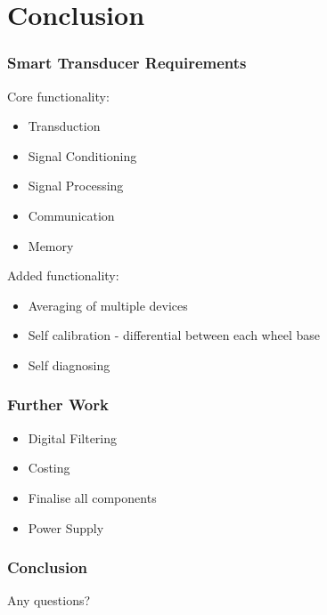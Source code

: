 \documentclass{beamer}
\begin{document}
\section{Conclusion}
\begin{frame}
\frametitle{Smart Transducer Requirements}
Core functionality:
\begin{itemize}
	\item Transduction
	\item Signal Conditioning
	\item Signal Processing
	\item Communication
	\item Memory
\end{itemize}
Added functionality:
\begin{itemize}
	\item Averaging of multiple devices
	\item Self calibration - differential between each wheel base
	\item Self diagnosing
\end{itemize}  

\end{frame}
\begin{frame}
\frametitle{Further Work}
\begin{itemize}
\item Digital Filtering
\item Costing
\item Finalise all components
\item Power Supply
\end{itemize}

\end{frame}

\begin{frame}
\frametitle{Conclusion}
Any questions?
\end{frame}
	
\end{document}
